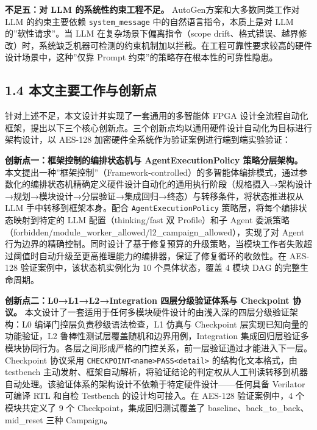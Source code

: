 \textbf{不足五：对 LLM 的系统性约束工程不足。}
AutoGen方案和大多数同类工作对 LLM 的约束主要依赖
\texttt{system\_message} 中的自然语言指令，本质上是对 LLM
的''软性请求''。当 LLM 在复杂场景下偏离指令（scope
drift、格式错误、越界修改）时，系统缺乏机器可检测的约束机制加以拦截。在工程可靠性要求较高的硬件设计场景中，这种''仅靠
Prompt 约束''的策略存在根本性的可靠性隐患。

\subsection{1.4
本文主要工作与创新点}\label{ux672cux6587ux4e3bux8981ux5de5ux4f5cux4e0eux521bux65b0ux70b9}

针对上述不足，本文设计并实现了一套通用的多智能体 FPGA
设计全流程自动化框架，提出以下三个核心创新点。三个创新点均以通用硬件设计自动化为目标进行架构设计，以
AES-128 加密硬件全系统作为验证案例进行端到端实验验证：

\textbf{创新点一：框架控制的编排状态机与 AgentExecutionPolicy
策略分层架构。}
本文提出一种''框架控制''（Framework-controlled）的多智能体编排模式，通过参数化的编排状态机精确定义硬件设计自动化的通用执行阶段（规格摄入→架构设计→规划→模块设计→分层验证→集成回归→终态）与转移条件，将状态推进权从
LLM 手中转移到框架本身。配合 \texttt{AgentExecutionPolicy}
策略层，将每个编排状态映射到特定的 LLM 配置（thinking/fast 双
Profile）和子 Agent
委派策略（forbidden/module\_worker\_allowed/l2\_campaign\_allowed），实现了对
Agent
行为边界的精确控制。同时设计了基于修复预算的升级策略，当模块工作者失败超过阈值时自动升级至更高推理能力的编排器，保证了修复循环的收敛性。在
AES-128 验证案例中，该状态机实例化为 10 个具体状态，覆盖 4 模块 DAG
的完整生命周期。

\textbf{创新点二：L0→L1→L2→Integration 四层分级验证体系与 Checkpoint
协议。}
本文设计了一套适用于任何多模块硬件设计的由浅入深的四层分级验证架构：L0
编译门控层负责秒级语法检查，L1 仿真与 Checkpoint
层实现已知向量的功能验证，L2 鲁棒性测试层覆盖随机和边界用例，Integration
集成回归层验证多模块协同行为。各层之间形成严格的门控关系，前一层验证通过才能进入下一层。Checkpoint
协议采用
\texttt{CHECKPOINT\textbar{}\textless{}name\textgreater{}\textbar{}PASS\textbar{}\textless{}detail\textgreater{}}
的结构化文本格式，由 testbench
主动发射、框架自动解析，将验证结论的判定权从人工判读转移到机器自动处理。该验证体系的架构设计不依赖于特定硬件设计------任何具备
Verilator 可编译 RTL 和自检 Testbench 的设计均可接入。在 AES-128
验证案例中，4 个模块共定义了 9 个 Checkpoint，集成回归测试覆盖了
baseline、back\_to\_back、mid\_reset 三种 Campaign。

